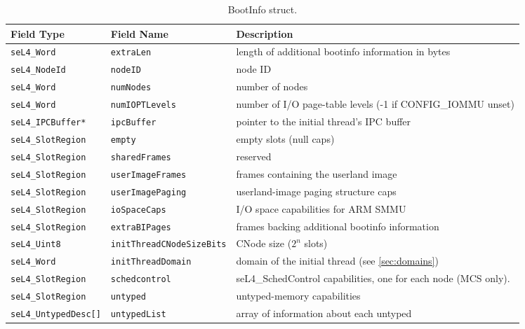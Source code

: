 \begin{table}[htb]
  \begin{center}
    \caption{BootInfo struct.}
    \label{tab:bootinfo_struct}
    \begin{tabularx}{\textwidth}{llX}
      \toprule
      Field Type & Field Name & Description \\
      \midrule
      \texttt{seL4\_Word}           & \texttt{extraLen}                & length of additional bootinfo information in bytes \\
      \texttt{seL4\_NodeId}         & \texttt{nodeID}                  & node ID \\
      \texttt{seL4\_Word}           & \texttt{numNodes}                & number of nodes \\
      \texttt{seL4\_Word}           & \texttt{numIOPTLevels}           & number of I/O page-table levels (-1 if CONFIG\_IOMMU unset) \\
      \texttt{seL4\_IPCBuffer*}     & \texttt{ipcBuffer}               & pointer to the initial thread's IPC buffer \\
      \texttt{seL4\_SlotRegion}     & \texttt{empty}                   & empty slots (null caps) \\
      \texttt{seL4\_SlotRegion}     & \texttt{sharedFrames}            & reserved \\
      \texttt{seL4\_SlotRegion}     & \texttt{userImageFrames}         & frames containing the userland image \\
      \texttt{seL4\_SlotRegion}     & \texttt{userImagePaging}         & userland-image paging structure caps \\
      \texttt{seL4\_SlotRegion}     & \texttt{ioSpaceCaps}             & I/O space capabilities for ARM SMMU \\
      \texttt{seL4\_SlotRegion}     & \texttt{extraBIPages}            & frames backing additional bootinfo information \\
      \texttt{seL4\_Uint8}          & \texttt{initThreadCNodeSizeBits} & CNode size ($2^n$ slots) \\
      \texttt{seL4\_Word}           & \texttt{initThreadDomain}        & domain of the initial thread (see \autoref{sec:domains}) \\
      \texttt{seL4\_SlotRegion}     & \texttt{schedcontrol}            & seL4\_SchedControl capabilities, one for each node (MCS only). \\
      \texttt{seL4\_SlotRegion}     & \texttt{untyped}                 & untyped-memory capabilities \\
      \texttt{seL4\_UntypedDesc[]}  & \texttt{untypedList}             & array of information about each untyped \\
      \bottomrule
    \end{tabularx}
  \end{center}
\end{table}

